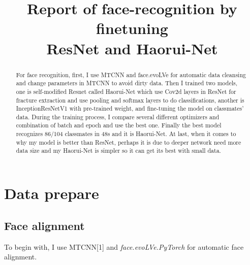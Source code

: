 \documentclass{article}
\title{Report of face-recognition by finetuning \\ ResNet and Haorui-Net}
\author{
   Haorui Li\thanks \\
  Chien-Shiung Wu College\\
  Southeast University\\
}
\begin{document}
\maketitle

\begin{abstract}
For face recognition, first, I use MTCNN and face.evoLVe for automatic data cleansing and change parameters in MTCNN to avoid dirty data. Then I trained two models, one is self-modified Resnet called Haorui-Net which use Cov2d layers in ResNet for fracture extraction and use pooling and softmax layers to do classifications, another is InceptionResNetV1 with pre-trained weight, and fine-tuning the model on classmates' data. During the training process, I compare several different optimizers and combination of batch and epoch and use the best one. Finally the best model recognizes 86/104 classmates in 48s and it is Haorui-Net. At last, when it comes to why my model is better than ResNet, perhaps it is due to deeper network need more data size and my Haorui-Net is simpler so it can get its best with small data.
\end{abstract}

\section{Data prepare}
\subsection{Face alignment}
To begin with, I use MTCNN[1] and \textit{face.evoLVe.PyTorch} for automatic face alignment.
\end{document}
